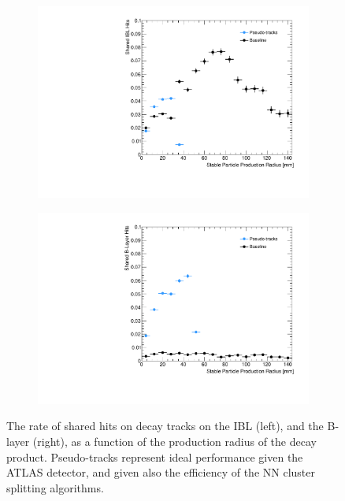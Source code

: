 \begin{figure}[!htbp]
    \centering
    \begin{subfigure}{.5\textwidth}
      \centering
      \includegraphics[width=\textwidth]{chapters/3.tracking/figs/po_nSharedOnIBL_From_B_DL.pdf}
    \end{subfigure}%
    \begin{subfigure}{.5\textwidth}
      \centering
      \includegraphics[width=\textwidth]{chapters/3.tracking/figs/po_nSharedOnBL_From_B_DL.pdf}
    \end{subfigure}
    \caption{
      The rate of shared hits on \bhadron decay tracks on the IBL (left), and the B-layer (right), as a function of the production radius of the \bhadron decay product. 
      Pseudo-tracks represent ideal performance given the ATLAS detector, and given also the efficiency of the NN cluster splitting algorithms.
    }
    \label{fig:shared_hits_pseudo}
\end{figure}



